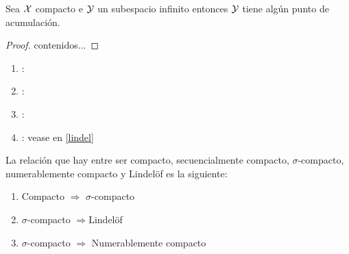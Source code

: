 \begin{prop}
		Sea $\mathcal{X}$ compacto e $\mathcal{Y}$ un subespacio infinito entonces $\mathcal{Y}$ tiene algún punto de acumulación.
	\begin{proof}
		contenidos...
	\end{proof}
\end{prop}

\begin{defi}[Definiciones]
	\begin{enumerate}
		\item {}: 
		\item {}: 
		\item {}: 
		\item {}: vease en \ref{lindel}
	\end{enumerate}
\end{defi}

\begin{obs}
	La relación que hay entre ser compacto, secuencialmente compacto, $\sigma$-compacto, numerablemente compacto y Lindelöf es la siguiente:
	\begin{enumerate}
		\item Compacto $\Rightarrow$ $\sigma$-compacto
		\item $\sigma$-compacto $\Rightarrow$Lindelöf
		\item $\sigma$-compacto $\Rightarrow$ Numerablemente compacto
	\end{enumerate}
\end{obs}
